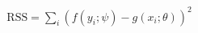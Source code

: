 \documentclass[10pt]{article}
\begin{document}
\begin{align*}\mathrm{RSS} = \sum_i \left( f\left(y_i;\psi\right) - g\left(x_i;\theta\right)\right)^2\end{align*}
\end{document}
